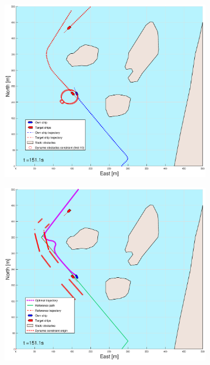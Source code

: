 \begin{figure}[ht]
\begin{subfigure}[b]{0.499\textwidth}
    \end{subfigure}
    \hfill
    \\ 
    \begin{subfigure}[b]{0.49\textwidth}
        \centering
        \includegraphics[width=\textwidth]{Images/Figures/Helloya/_Simple_0fig1_time=151}
    \end{subfigure}
    \hfill
    \begin{subfigure}[b]{0.499\textwidth}
        \centering
        \includegraphics[width=\textwidth]{Images/Figures/Helloya/_Simple_0fig999_time=151}
    \end{subfigure}
    \hfill
\end{figure}
